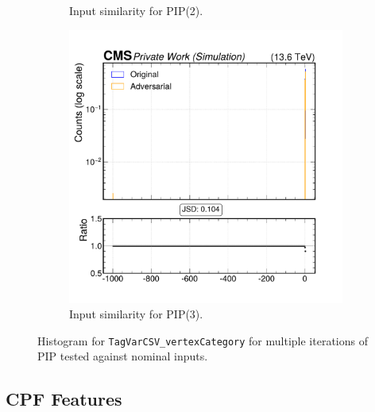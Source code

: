 \begin{figure}[h]
\begin{subfigure}[t]{0.32\textwidth}
    \caption{Input similarity for PIP(2).}
  \end{subfigure}\hfill
  \begin{subfigure}[t]{0.32\textwidth}
    \includegraphics[width=\linewidth]{media/output/features/compare/intprob_3/cmp_global_features_TagVarCSV_vertexCategory.pdf}
    \caption{Input similarity for PIP(3).}
  \end{subfigure}

  \caption{Histogram for \texttt{TagVarCSV\_vertexCategory} for multiple iterations of PIP tested against nominal inputs.}
  \label{fig:intprob_input_TagVarCSV_vertexCategory}
\end{figure}

\FloatBarrier
\newpage
\subsection*{CPF Features}

